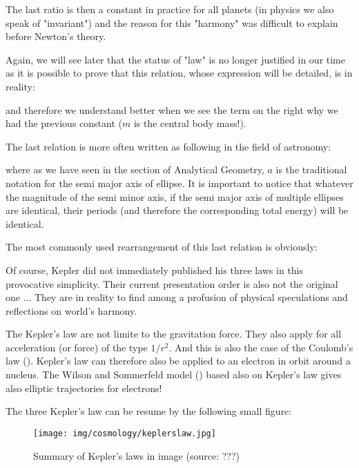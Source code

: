 	The last ratio is then a constant in practice for all planets (in physics we also speak of "invariant") and the reason for this "harmony" was difficult to explain before Newton's theory.
	
	Again, we will see later that the status of "law" is no longer justified in our time as it is possible to prove that this relation, whose expression will be detailed, is in reality:
	
	and therefore we understand better when we see the term on the right why we had the previous constant ($m$ is the central body mass!).
	
	The last relation is more often written as following in the field of astronomy:
	
	where as we have seen in the section of Analytical Geometry, $a$ is the traditional notation for the semi major axis of ellipse. It is important to notice that whatever the magnitude of the semi minor axis,  if the semi major axis of multiple ellipses are identical, their periods (and therefore the corresponding total energy) will be identical.
	
	The most commonly used rearrangement of this last relation is obviously:
	
		
	Of course, Kepler did not immediately published his three laws in this provocative simplicity. Their current presentation order is also not the original one ... They are  in reality to find among  a profusion of physical speculations and reflections on world's harmony.
	
	\begin{tcolorbox}[title=Remark,colframe=black,arc=10pt]
	The Kepler's law are not limite to the gravitation force. They also apply for all acceleration (or force) of the type $1/r^2$. And this is also the case of the Coulomb's law (). Kepler's law can therefore also be applied to an electron in orbit around a nucleus. The Wilson and Sommerfeld model () based also on Kepler's law gives also elliptic trajectories for electrons!
	\end{tcolorbox}	
	
	The three Kepler's law can be resume by the following small figure:
	\begin{figure}[H]
		\begin{center}
		\texttt{[image: img/cosmology/keplerslaw.jpg]}
		\end{center}	
		\caption[Summary of Kepler's laws in image]{Summary of Kepler's laws in image (source: ???)}
	\end{figure}
	
